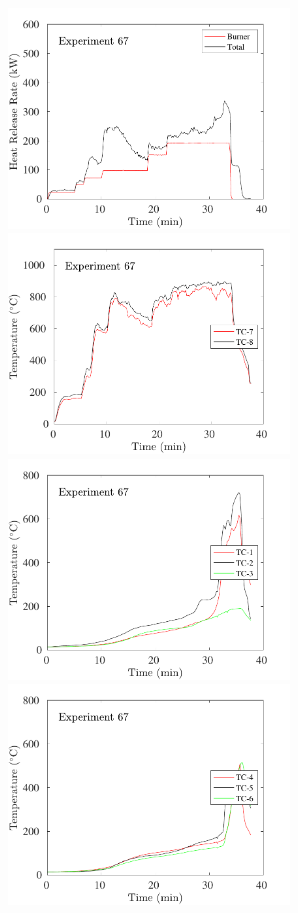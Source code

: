 \begin{figure}[H]
\includegraphics[height=2.30in]{../SCRIPT_FIGURES/Test_67_HRR} \hfill
\includegraphics[height=2.30in]{../SCRIPT_FIGURES/Test_67_TC_7-8} \\
\includegraphics[height=2.30in]{../SCRIPT_FIGURES/Test_67_TC_1-3} \hfill
\includegraphics[height=2.30in]{../SCRIPT_FIGURES/Test_67_TC_4-6}

\end{figure}
